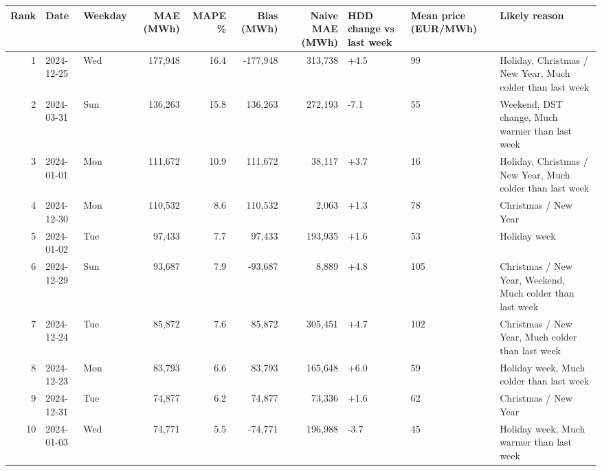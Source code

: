 \begin{tabular}{rllrrrrlll}
\toprule
Rank & Date & Weekday & MAE (MWh) & MAPE \% & Bias (MWh) & Naive MAE (MWh) & HDD change vs last week & Mean price (EUR/MWh) & Likely reason \\
\midrule
1 & 2024-12-25 & Wed & 177,948 & 16.4 & -177,948 & 313,738 & +4.5 & 99 & Holiday, Christmas / New Year, Much colder than last week \\
2 & 2024-03-31 & Sun & 136,263 & 15.8 & 136,263 & 272,193 & -7.1 & 55 & Weekend, DST change, Much warmer than last week \\
3 & 2024-01-01 & Mon & 111,672 & 10.9 & 111,672 & 38,117 & +3.7 & 16 & Holiday, Christmas / New Year, Much colder than last week \\
4 & 2024-12-30 & Mon & 110,532 & 8.6 & 110,532 & 2,063 & +1.3 & 78 & Christmas / New Year \\
5 & 2024-01-02 & Tue & 97,433 & 7.7 & 97,433 & 193,935 & +1.6 & 53 & Holiday week \\
6 & 2024-12-29 & Sun & 93,687 & 7.9 & -93,687 & 8,889 & +4.8 & 105 & Christmas / New Year, Weekend, Much colder than last week \\
7 & 2024-12-24 & Tue & 85,872 & 7.6 & 85,872 & 305,451 & +4.7 & 102 & Christmas / New Year, Much colder than last week \\
8 & 2024-12-23 & Mon & 83,793 & 6.6 & 83,793 & 165,648 & +6.0 & 59 & Holiday week, Much colder than last week \\
9 & 2024-12-31 & Tue & 74,877 & 6.2 & 74,877 & 73,336 & +1.6 & 62 & Christmas / New Year \\
10 & 2024-01-03 & Wed & 74,771 & 5.5 & -74,771 & 196,988 & -3.7 & 45 & Holiday week, Much warmer than last week \\
\bottomrule
\end{tabular}
